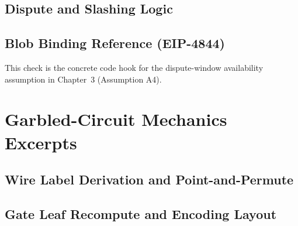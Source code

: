 \documentclass[final,twoside]{vutinfth}
\begin{document}


\section{Dispute and Slashing Logic}
\label{app:a3}




\section{Blob Binding Reference (EIP-4844)}
\label{app:a4}

This check is the concrete code hook for the dispute-window availability
assumption in Chapter~3 (Assumption A4).

\chapter{Garbled-Circuit Mechanics Excerpts}
\label{app:gc}
\section{Wire Label Derivation and Point-and-Permute}
\label{app:b1}


\section{Gate Leaf Recompute and Encoding Layout}
\label{app:b2}

\end{document}
